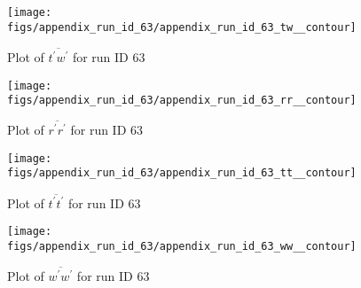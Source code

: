 \begin{figure}[H]
\centering
\texttt{[image: figs/appendix\_run\_id\_63/appendix\_run\_id\_63\_tw\_\_contour]}
\caption{Plot of $\overline{t^\prime w^\prime}$ for run ID 63}
\label{fig:appendix_run_id_63_tw__contour}
\end{figure}


\begin{figure}[H]
\centering
\texttt{[image: figs/appendix\_run\_id\_63/appendix\_run\_id\_63\_rr\_\_contour]}
\caption{Plot of $\overline{r^\prime r^\prime}$ for run ID 63}
\label{fig:appendix_run_id_63_rr__contour}
\end{figure}


\begin{figure}[H]
\centering
\texttt{[image: figs/appendix\_run\_id\_63/appendix\_run\_id\_63\_tt\_\_contour]}
\caption{Plot of $\overline{t^\prime t^\prime}$ for run ID 63}
\label{fig:appendix_run_id_63_tt__contour}
\end{figure}


\begin{figure}[H]
\centering
\texttt{[image: figs/appendix\_run\_id\_63/appendix\_run\_id\_63\_ww\_\_contour]}
\caption{Plot of $\overline{w^\prime w^\prime}$ for run ID 63}
\label{fig:appendix_run_id_63_ww__contour}
\end{figure}


